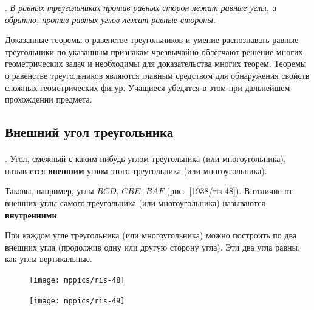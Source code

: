 \smallskip
\mbox{.}
\emph{В равных треугольниках против равных сторон лежат равные углы, и обратно, против равных углов лежат равные стороны.}

Доказанные теоремы о равенстве треугольников и умение распознавать равные треугольники по указанным признакам чрезвычайно облегчают решение многих геометрических задач и необходимы для доказательства многих теорем.
Теоремы о равенстве треугольников являются главным средством для обнаружения свойств сложных геометрических фигур.
Учащиеся убедятся в этом при дальнейшем прохождении предмета.

\subsection*{Внешний угол треугольника}

\paragraph{}\label{1938/43}
\mbox{.}
Угол, смежный с каким-нибудь углом треугольника (или многоугольника), называется \textbf{внешним} углом этого треугольника (или многоугольника). 

Таковы, например, углы $BCD$, $CBE$, $BAF$ (рис.~\ref{1938/ris-48}).
В отличие от внешних углы самого треугольника (или многоугольника) называются \textbf{внутренними}. 

При каждом угле треугольника (или многоугольника) можно построить по два внешних угла (продолжив одну или другую сторону угла).
Эти два угла равны, как углы вертикальные.

\begin{figure}[h!]
\begin{minipage}{.48\textwidth}
\centering
\texttt{[image: mppics/ris-48]}
\end{minipage}\hfill
\begin{minipage}{.48\textwidth}
\centering
\texttt{[image: mppics/ris-49]}
\end{minipage}

\begin{minipage}{.48\textwidth}
\centering
\caption{}\label{1938/ris-48}
\end{minipage}\hfill
\begin{minipage}{.48\textwidth}
\centering
\caption{}\label{1938/ris-49}
\end{minipage}
\end{figure}


